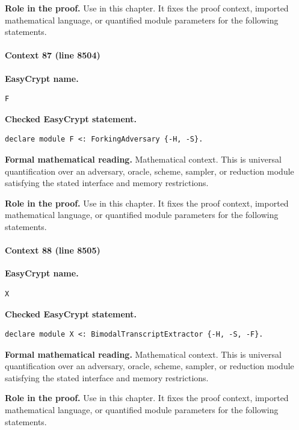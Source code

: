 \noindent\textbf{Role in the proof.}
Use in this chapter. It fixes the proof context, imported mathematical language, or quantified module parameters for the following statements.

\paragraph{Context 87 (line 8504)}
\noindent\textbf{EasyCrypt name.}
\begin{lstlisting}[language=EasyCrypt,basicstyle=\ttfamily\scriptsize]
F
\end{lstlisting}
\noindent\textbf{Checked EasyCrypt statement.}
\begin{lstlisting}[language=EasyCrypt,basicstyle=\ttfamily\scriptsize]
declare module F <: ForkingAdversary {-H, -S}.
\end{lstlisting}
\noindent\textbf{Formal mathematical reading.}
Mathematical context. This is universal quantification over an adversary, oracle, scheme, sampler, or reduction module satisfying the stated interface and memory restrictions.

\noindent\textbf{Role in the proof.}
Use in this chapter. It fixes the proof context, imported mathematical language, or quantified module parameters for the following statements.

\paragraph{Context 88 (line 8505)}
\noindent\textbf{EasyCrypt name.}
\begin{lstlisting}[language=EasyCrypt,basicstyle=\ttfamily\scriptsize]
X
\end{lstlisting}
\noindent\textbf{Checked EasyCrypt statement.}
\begin{lstlisting}[language=EasyCrypt,basicstyle=\ttfamily\scriptsize]
declare module X <: BimodalTranscriptExtractor {-H, -S, -F}.
\end{lstlisting}
\noindent\textbf{Formal mathematical reading.}
Mathematical context. This is universal quantification over an adversary, oracle, scheme, sampler, or reduction module satisfying the stated interface and memory restrictions.

\noindent\textbf{Role in the proof.}
Use in this chapter. It fixes the proof context, imported mathematical language, or quantified module parameters for the following statements.

